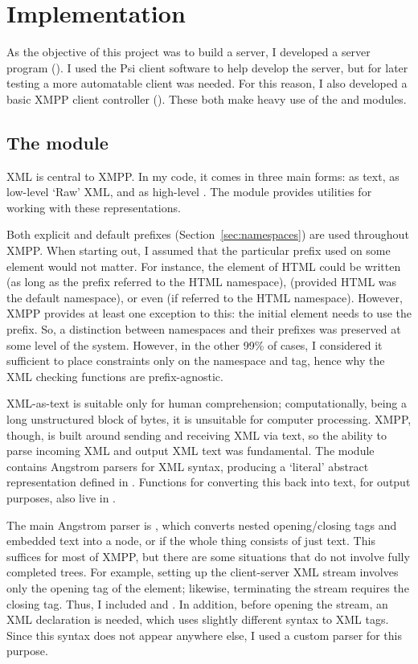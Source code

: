 \chapter{Implementation}
As the objective of this project was to build a server, I developed a server program (). I used the Psi client software to help develop the server, but for later testing a more automatable client was needed. For this reason, I also developed a basic XMPP client controller ().
These both make heavy use of the  and  modules.

\section{The  module}\label{sec:xmlmod}
XML is central to XMPP. In my code, it comes in three main forms: as text, as low-level `Raw' XML, and as high-level . The  module provides utilities for working with these representations.

Both explicit and default prefixes (Section~\ref{sec:namespaces}) are used throughout XMPP. When starting out, I assumed that the particular prefix used on some element would not matter. For instance, the  element of HTML could be written  (as long as the  prefix referred to the HTML namespace),  (provided HTML was the default namespace), or even  (if  referred to the HTML namespace). However, XMPP provides at least one exception to this: the initial  element needs to use the  prefix. So, a distinction between namespaces and their prefixes was preserved at some level of the system. However, in the other 99\% of cases, I considered it sufficient to place constraints only on the namespace and tag, hence why the XML checking functions are prefix-agnostic.

XML-as-text is suitable only for human comprehension; computationally, being a long unstructured block of bytes, it is unsuitable for computer processing. XMPP, though, is built around sending and receiving XML via text, so the ability to parse incoming XML and output XML text was fundamental. The  module contains Angstrom parsers for XML syntax, producing a `literal' abstract representation defined in . Functions for converting this back into text, for output purposes, also live in .

The main Angstrom parser is , which converts nested opening/closing tags and embedded text into a  node, or  if the whole thing consists of just text. This suffices for most of XMPP, but there are some situations that do not involve fully completed trees. For example, setting up the client-server XML stream involves only the opening tag of the  element; likewise, terminating the stream requires the closing tag. Thus, I included  and . In addition, before opening the stream, an XML declaration  is needed, which uses slightly different syntax to XML tags. Since this syntax does not appear anywhere else, I used a custom parser for this purpose.

